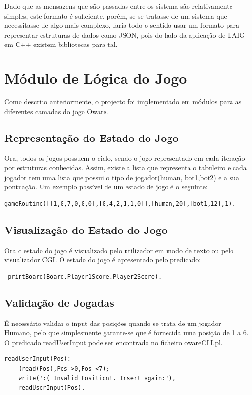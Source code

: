 \documentclass[15pt,a4paper]{article}
\begin{document}
Dado que as mensagens que são passadas entre os sistema são relativamente simples, este formato é suficiente, porém, se se tratasse de um sistema que necessitasse de algo mais complexo, faria todo o sentido usar um formato para representar estruturas de dados como JSON, pois do lado da aplicação de LAIG em C++ existem bibliotecas para tal.

\section{Módulo de Lógica do Jogo}
Como descrito anteriormente, o projecto foi implementado em módulos para as diferentes camadas do jogo Oware.

\subsection{Representação do Estado do Jogo}
Ora, todos os jogos possuem o ciclo, sendo o jogo representado em cada iteração por estruturas conhecidas. Assim, existe a lista que representa o tabuleiro e cada jogador tem uma lista que possui o tipo de jogador(human, bot1,bot2) e a sua pontuação. Um exemplo possível de um estado de jogo é o seguinte:
\begin{verbatim}
gameRoutine([[1,0,7,0,0,0],[0,4,2,1,1,0]],[human,20],[bot1,12],1).
\end{verbatim}

\subsection{Visualização do Estado do Jogo}
Ora o estado do jogo é visualizado pelo utilizador em modo de texto ou pelo visualizador CGI. O estado do jogo é apresentado pelo predicado:
\begin{verbatim}
 printBoard(Board,Player1Score,Player2Score).
\end{verbatim}

\subsection{Validação de Jogadas}
É necessário validar o input das posições quando se trata de um jogador Humano, pelo que simplesmente garante-se que é fornecida uma posição de 1 a 6. O predicado readUserInput pode ser encontrado no ficheiro owareCLI.pl.
\begin{verbatim}
readUserInput(Pos):-
	(read(Pos),Pos >0,Pos <7);
	write(':( Invalid Position!. Insert again:'),
	readUserInput(Pos).
\end{verbatim}
\end{document}
